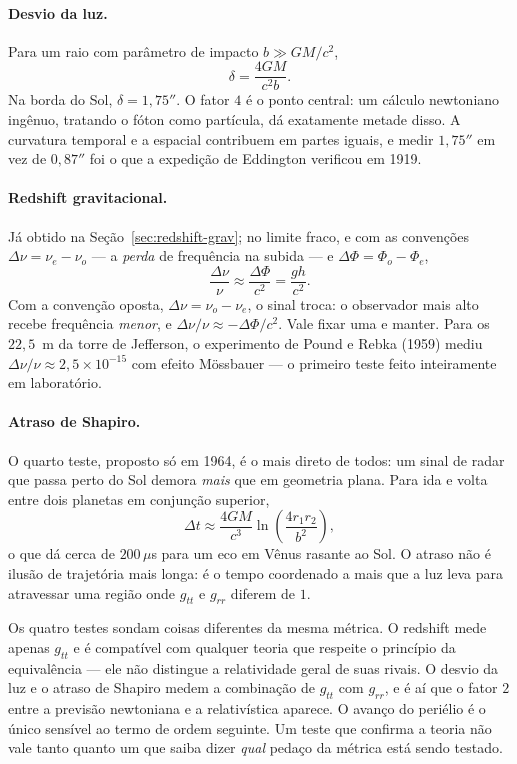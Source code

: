 \documentclass[12pt,a4paper,oneside]{book}
\theoremstyle{rgplain}
\theoremstyle{rgremark}
\begin{document}
\paragraph{Desvio da luz.} Para um raio com parâmetro de impacto $b\gg GM/c^2$,
\begin{equation}
  \delta=\frac{4GM}{c^2b} .
  \label{eq:deflexao}
\end{equation}
Na borda do Sol, $\delta=1{,}75''$. O fator $4$ é o ponto central: um cálculo
newtoniano ingênuo, tratando o fóton como partícula, dá exatamente metade
disso. A curvatura temporal e a espacial contribuem em partes iguais, e medir
$1{,}75''$ em vez de $0{,}87''$ foi o que a expedição de Eddington
verificou em 1919.

\paragraph{Redshift gravitacional.} Já obtido na
Seção~\ref{sec:redshift-grav}; no limite fraco, e com as convenções
$\Delta\nu=\nu_e-\nu_o$ --- a \emph{perda} de frequência na subida --- e
$\Delta\Phi=\Phi_o-\Phi_e$,
\[
  \frac{\Delta\nu}{\nu}\approx\frac{\Delta\Phi}{c^2}=\frac{gh}{c^2}.
\]
Com a convenção oposta, $\Delta\nu=\nu_o-\nu_e$, o sinal troca: o
observador mais alto recebe frequência \emph{menor}, e
$\Delta\nu/\nu\approx-\Delta\Phi/c^2$. Vale fixar uma e manter.
Para os $22{,}5$~m da torre de Jefferson, o experimento de Pound e Rebka
(1959) mediu $\Delta\nu/\nu\approx2{,}5\times10^{-15}$ com efeito
Mössbauer --- o primeiro teste feito inteiramente em laboratório.

\paragraph{Atraso de Shapiro.} O quarto teste, proposto só em 1964, é o mais
direto de todos: um sinal de radar que passa perto do Sol demora \emph{mais}
que em geometria plana. Para ida e volta entre dois planetas em conjunção
superior,
\begin{equation}
  \Delta t\approx\frac{4GM}{c^3}
  \ln\!\left(\frac{4r_1r_2}{b^2}\right),
  \label{eq:shapiro}
\end{equation}
o que dá cerca de $200\,\mu$s para um eco em Vênus rasante ao Sol. O atraso
não é ilusão de trajetória mais longa: é o tempo coordenado a mais que a luz
leva para atravessar uma região onde $g_{tt}$ e $g_{rr}$ diferem de $1$.

\begin{central}
Os quatro testes sondam coisas diferentes da mesma métrica. O redshift mede
apenas $g_{tt}$ e é compatível com qualquer teoria que respeite o princípio
da equivalência --- ele não distingue a relatividade geral de suas rivais. O
desvio da luz e o atraso de Shapiro medem a combinação de $g_{tt}$ com
$g_{rr}$, e é aí que o fator $2$ entre a previsão newtoniana e a
relativística aparece. O avanço do periélio é o único sensível ao termo de
ordem seguinte. Um teste que confirma a teoria não vale tanto quanto um que
saiba dizer \emph{qual} pedaço da métrica está sendo testado.
\end{central}
\end{document}
